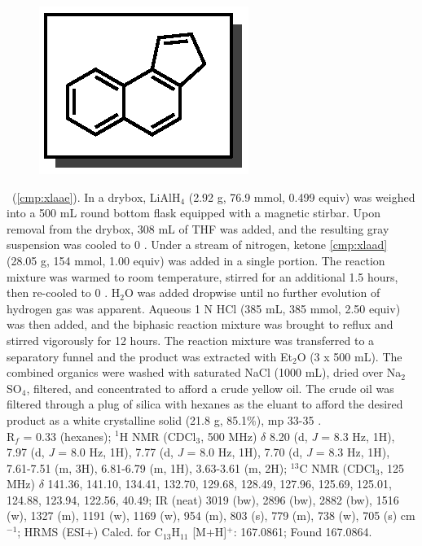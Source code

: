 \vspace{10pt}
\begin{figure}
  \vspace{-25pt}
  \begin{center}
    \includegraphics[scale=0.8]{chp_asymmetric/images/xlaae}
  \end{center}
  \vspace{-30pt}
\end{figure}
\noindent \textbf{\CMPxlaae}\ (\ref{cmp:xlaae}). In a drybox, LiAlH$_4$ (2.92 g, 76.9
mmol, 0.499 equiv) was weighed into a 500 mL round bottom flask equipped
with a magnetic stirbar. Upon removal from the drybox, 308 mL of THF was added,
and the resulting gray suspension was cooled to 0 \degc. Under a stream of
nitrogen, ketone \ref{cmp:xlaad} (28.05 g, 154 mmol, 1.00 equiv) was added
in a single portion. The reaction mixture was warmed to room temperature, stirred for
an additional 1.5 hours, then re-cooled to 0 \degc. H$_2$O was added dropwise
until no further evolution of hydrogen gas was apparent. Aqueous 1 N HCl (385
mL, 385 mmol, 2.50 equiv) was then added, and the biphasic reaction
mixture was brought to reflux and stirred vigorously for 12 hours. The
reaction mixture was transferred to a separatory funnel and the product was extracted with Et$_2$O (3 x 500 mL). The combined organics were
washed with saturated NaCl (1000 mL), dried over Na$_2$SO$_4$, filtered, and
concentrated to afford a crude yellow oil. The crude oil was filtered through a
plug of silica with hexanes as the eluant to afford the desired product as a
white crystalline solid (21.8 g, 85.1\%), mp 33-35 \degc.\\
R$_f$ = 0.33 (hexanes); $^1$H NMR (CDCl$_3$, 500 MHz) $\delta$ 8.20 (d,
\textit{J} = 8.3 Hz, 1H), 7.97 (d, \textit{J} = 8.0 Hz, 1H), 7.77 (d, \textit{J}
= 8.0 Hz, 1H), 7.70 (d, \textit{J} = 8.3 Hz, 1H), 7.61-7.51 (m, 3H), 6.81-6.79
(m, 1H), 3.63-3.61 (m, 2H); $^{13}$C NMR (CDCl$_3$, 125 MHz) $\delta$ 141.36,
141.10, 134.41, 132.70, 129.68, 128.49, 127.96, 125.69, 125.01, 124.88, 123.94,
122.56, 40.49; IR (neat) 3019 (bw), 2896 (bw), 2882 (bw), 1516 (w), 1327 (m),
1191 (w), 1169 (w), 954 (m), 803 (s), 779 (m), 738 (w), 705 (s) cm$^{-1}$; HRMS (ESI+) Calcd. for C$_{13}$H$_{11}$ [M+H]$^+$: 167.0861; Found 167.0864.

